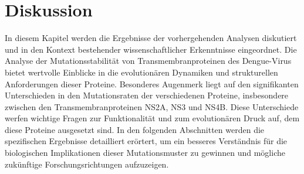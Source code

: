 \documentclass[german,version-2022-01]{uzl-thesis}
\begin{document}
\chapter{Diskussion}
In diesem Kapitel werden die Ergebnisse der vorhergehenden Analysen diskutiert und in den Kontext bestehender wissenschaftlicher Erkenntnisse eingeordnet. Die Analyse der Mutationsstabilit\"at von Transmembranproteinen des Dengue-Virus bietet wertvolle Einblicke in die evolution\"aren Dynamiken und strukturellen Anforderungen dieser Proteine. Besonderes Augenmerk liegt auf den signifikanten Unterschieden in den Mutationsraten der verschiedenen Proteine, insbesondere zwischen den Transmembranproteinen NS2A, NS3 und NS4B. Diese Unterschiede werfen wichtige Fragen zur Funktionalit\"at und zum evolution\"aren Druck auf, dem diese Proteine ausgesetzt sind. In den folgenden Abschnitten werden die spezifischen Ergebnisse detailliert er\"ortert, um ein besseres Verst\"andnis f\"ur die biologischen Implikationen dieser Mutationsmuster zu gewinnen und m\"ogliche zuk\"unftige Forschungsrichtungen aufzuzeigen.
\end{document}
